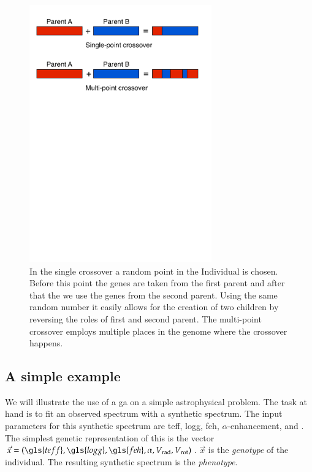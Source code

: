 \begin{figure}[htbp] %
   \centering
   \includegraphics[width=0.7\textwidth,trim=0 18cm 0 0]{chapter_dalek/plots/crossovers.pdf} 
   \caption{In the single crossover a random point in the Individual is chosen. Before this point the genes are taken from the first parent and after that the we use the genes from the second parent. Using the same random number it easily allows for the creation of two children by reversing the roles of first and second parent. The multi-point crossover employs multiple places in the genome where the crossover happens.}
   \label{fig:crossover}
\end{figure}





\subsection{A simple example}
We will illustrate the use of a \gls{ga} on a simple astrophysical problem. The task at hand is to fit an observed spectrum with a synthetic spectrum. The input parameters for this synthetic spectrum are \gls{teff}, \gls{logg}, \gls{feh}, $\alpha$-enhancement, \vrad and \vrot. The simplest genetic representation of this is the vector $\vec{x} = (\gls{teff}, \gls{logg}, \gls{feh}, \alpha, \vrad, \vrot)$. $\vec{x}$ is the \textit{genotype} of the individual. The resulting synthetic spectrum is the \textit{phenotype}. 

